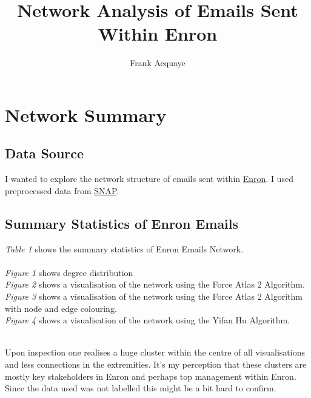 \documentclass[11pt, oneside]{article}   	%
\title{Network Analysis of Emails Sent Within Enron}
\author{Frank Acquaye}
\begin{document}
	\maketitle
	
	\section{Network Summary}
	\subsection{Data Source}
	I wanted to explore the network structure of emails sent within \href{https://en.wikipedia.org/wiki/Enron}{Enron}. I used preprocessed data from  \href{http://snap.stanford.edu/data/email-Enron.html}{SNAP}.
	\subsection{Summary Statistics of Enron Emails}
	\emph{Table 1} shows the summary statistics of Enron Emails Network. \\
	\\
	\emph{Figure 1} shows degree distribution \\
	\emph{Figure 2} shows a visualisation of the network using the Force Atlas 2 Algorithm. \\
	\emph{Figure 3} shows a visualisation of the network using the Force Atlas 2 Algorithm with node and edge colouring. \\
	\emph{Figure 4} shows a visualisation of the network using the Yifan Hu Algorithm. \\
	\\
	\par
	Upon inspection one realises a huge cluster within the centre of all visualisations and less connections in the extremities. It's my perception that these clusters are mostly key stakeholders in Enron and perhaps top management within Enron. Since the data used was not labelled this might be a bit hard to confirm.
\end{document}
